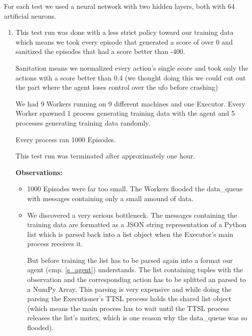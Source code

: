 For each test we used a neural network with two hidden
layers, both with 64 artificial neurons.

\begin{enumerate}

  \item This test run was done with a less strict policy
        toward our training data which means we took every
        episode that generated a score of over 0 and
        sanitized the episodes that had a score better than
        -400.

        Sanitation means we normalized every action's
        single score and took only the actions with a score
        better than 0.4 (we thought doing this we could
        cut out the part where the agent loses control over
        the ufo before crashing)

        We had 9 Workers running on 9 different machines
        and one Executor. Every Worker spawned 1 process
        generating training data with the agent and 5
        processes generating training data randomly.

        Every process ran 1000 Episodes.

        This test run was terminated after approximately
        one hour.

        \textbf{Observations:}

        \begin{itemize}

          \item 1000 Episodes were far too small. The
                Workers flooded the data\_queue with
                messages containing only a small amound of
                data.

          \item We discovered a very serious bottleneck.
                The messages containing the training data
                are formatted as a JSON string
                representation of a Python list which is
                parsed back into a list object when the
                Executor's main process receives it.

                But before training the list has to be
                parsed again into a format our agent (cmp.
                \ref{s_agent}) understands. The list
                containing tuples with the observation and
                the corresponding action has to be splitted
                an parsed to a NumPy Array. This parsing is
                very expensive and while doing the parsing
                the Executioner's TTSL process holds the
                shared list object (which means the main
                process has to wait until the TTSL process
                releases the list's mutex, which is one
                reason why the data\_queue was so flooded).


\end{itemize}
\end{enumerate}
